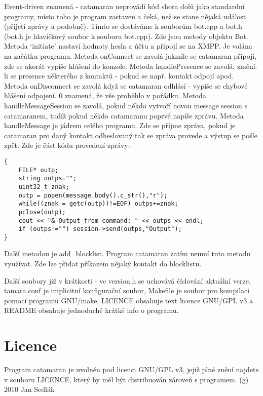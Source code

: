 \documentclass[a4paper,11pt,titlepage]{article}
\begin{document}
Event-driven znamená  - catamaran neprovádí kód shora dolů jako standardní
programy, místo toho je program zastaven a čeká, než se stane nějaká událost (přijetí zprávy a podobně). Tímto se dostáváme k souborům bot.cpp a bot.h (bot.h je hlavičkový soubor k souboru
bot.cpp). Zde jsou metody objektu Bot. Metoda `initiate' nastaví hodnoty hesla a účtu a připojí se na XMPP. Je volána na začátku programu. Metoda onConnect se zavolá jakmile se catamaran
připojí, zde se akorát vypíše hlášení do konzole. Metoda handlePresence se zavolá, změní-li se presence některého z kontaktů - pokud se např. kontakt odpojí apod. Metoda onDisconnect se zavolá
když se catamaran odhlásí - vypíše se chybové hlášení odpojení. 0 znamená, že vše proběhlo v pořádku. Metoda handleMessageSession se zavolá, pokud někdo vytvoří novou message session s
catamaranem, tudíž pokud někdo catamaranu poprvé napíše zprávu. Metoda handleMessage je jádrem celého programu. Zde se příjme zpráva, pokud je catamaran pro daný kontakt odheslovaný tak se
zpráva provede a výstup se pošle zpět. Zde je část kódu provedení zprávy:
\begin{verbatim}
{
	FILE* outp;
	string outps="";
	uint32_t znak;
	outp = popen(message.body().c_str(),"r");
	while((znak = getc(outp))!=EOF) outps+=znak;
	pclose(outp);
	cout << "& Output from command: " << outps << endl;
	if (outps!="") session->send(outps,"Output");
}
\end{verbatim}
Další metodou je add\_blocklist. Program catamaran zatím neumí tuto metodu využívat. Zde lze přidat příkazem nějaký kontakt do blocklistu.

Další soubory již v krátkosti - ve version.h se uchovává číslování aktuální verze, tamara.conf je implicitní konfigurační soubor, Makefile je soubor pro kompilaci pomocí programu GNU/make,
LICENCE obsahuje text licence GNU/GPL v3 a README obsahuje jednoduché krátké info o programu.
\section{Licence}
Program catamaran je uvolněn pod licenci GNU/GPL v3, jejiž plné znění najdete v souboru LICENCE, který by měl být distribuován zároveň s programem.
(g) 2010 Jan Sedlák
\end{document}
